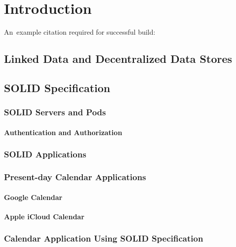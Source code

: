 \chapter{Introduction}

An~example citation required for successful build: \cite{Example}

\section{Linked Data and Decentralized Data Stores}

\section{SOLID Specification}

\subsection*{SOLID Servers and Pods}

\subsubsection*{Authentication and Authorization}

\subsection*{SOLID Applications}

\subsection{Present-day Calendar Applications}
\label{chap01:presentdaycals}

\subsubsection*{Google Calendar}

\subsubsection*{Apple iCloud Calendar}

\subsection*{Calendar Application Using SOLID Specification}

